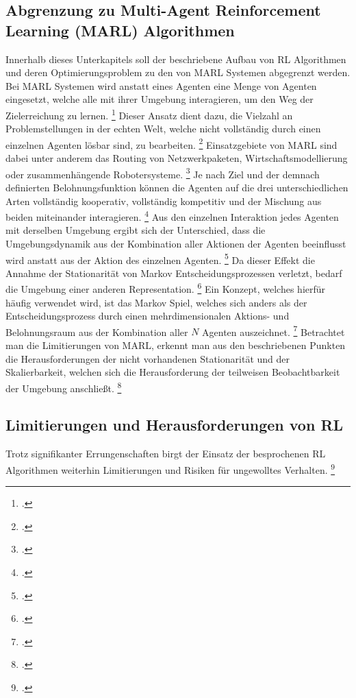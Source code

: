\subsection{Abgrenzung zu Multi-Agent Reinforcement Learning (MARL) Algorithmen}
Innerhalb dieses Unterkapitels soll der beschriebene Aufbau von RL Algorithmen und deren Optimierungsproblem zu den von MARL Systemen abgegrenzt werden.
Bei MARL Systemen wird anstatt eines Agenten eine Menge von Agenten eingesetzt, welche alle mit ihrer Umgebung interagieren, um den Weg der Zielerreichung zu lernen. \footcite[Vgl.][S. 6]{Wong.2022}
Dieser Ansatz dient dazu, die Vielzahl an Problemstellungen in der echten Welt, welche nicht vollständig durch einen einzelnen Agenten lösbar sind, zu bearbeiten. \footcite[Vgl.][S. 1]{Canese.2021}
Einsatzgebiete von MARL sind dabei unter anderem das Routing von Netzwerkpaketen, Wirtschaftsmodellierung oder zusammenhängende Robotersysteme. \footcite[Vgl.][S. 1]{Canese.2021}
Je nach Ziel und der demnach definierten Belohnungsfunktion können die Agenten auf die drei unterschiedlichen Arten vollständig kooperativ, vollständig kompetitiv und der Mischung aus beiden miteinander interagieren. \footcite[Vgl.][S. 8f.]{Canese.2021}
Aus den einzelnen Interaktion jedes Agenten mit derselben Umgebung ergibt sich der Unterschied, dass die Umgebungsdynamik aus der Kombination aller Aktionen der Agenten beeinflusst wird anstatt aus der Aktion des einzelnen Agenten. \footcite[Vgl.][S. 2]{Wong.2022}
Da dieser Effekt die Annahme der Stationarität von Markov Entscheidungsprozessen verletzt, bedarf die Umgebung einer anderen Representation. \footcite[Vgl.][S. 6]{Wong.2022}
Ein Konzept, welches hierfür häufig verwendet wird, ist das Markov Spiel, welches sich anders als der Entscheidungsprozess durch einen mehrdimensionalen Aktions- und Belohnungsraum aus der Kombination aller $N$ Agenten auszeichnet. \footcite[Vgl.][S. 4]{Canese.2021}
Betrachtet man die Limitierungen von MARL, erkennt man aus den beschriebenen Punkten die Herausforderungen der nicht vorhandenen Stationarität und der Skalierbarkeit, welchen sich die Herausforderung der teilweisen Beobachtbarkeit der Umgebung anschließt. \footcite[Vgl.][S. 9ff.]{Canese.2021}

\subsection{Limitierungen und Herausforderungen von RL}
Trotz signifikanter Errungenschaften birgt der Einsatz der besprochenen RL Algorithmen weiterhin Limitierungen und Risiken für ungewolltes Verhalten. \footcite[Vgl.][S. 7]{Li.2019}

